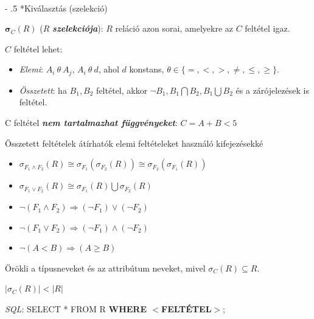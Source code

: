 \documentclass[tikz,12pt,margin=0px]{article}
\makeatletter
\renewcommand\paragraph{%
	\@startsection{paragraph}{4}{0mm}%
	{-\baselineskip}%
	{.5\baselineskip}%
	{\normalfont\normalsize\bfseries}}
\makeatother
\begin{document}
    \  \\

    \paragraph*{Kiválasztás (szelekció)}

    $\boldsymbol{\sigma}_{C}(R)$ ($R$ \emph{\textbf{szelekciója}}): $R$ reláció azon sorai, amelyekre az $C$ feltétel igaz.

    \begin{itemize}
        \item $C$ feltétel lehet:
        \begin{itemize}
            \item \emph{Elemi}: $A_i\ \theta\ A_j$, $A_i\ \theta\ d$, ahol $d$ konstans, $\theta \in \Big\{=, <, >, \neq, \leq, \geq\Big\}$.
            \item \emph{Összetett}: ha $B_1, B_2$ feltétel, akkor $\neg B_1, B_1 \bigcap B_2, B_1 \bigcup B_2$ és a zárójelezések is feltétel.
        \end{itemize}
        \item C feltétel \emph{\textbf{nem tartalmazhat függvényeket}}: $C = A + B < 5$
        {\small
        \item Összetett feltételek átírhatók elemi feltételeket használó kifejezésekké
        \begin{itemize}
            \item $\sigma_{F_1 \wedge F_2}(R) \cong \sigma_{F_1}(\sigma_{F_2}(R)) \cong \sigma_{F_2}(\sigma_{F_1}(R))$
            \item $\sigma_{F_1 \vee F_2}(R) \cong \sigma_{F_1}(R) \bigcup \sigma_{F_2}(R)$
            \item $\neg (F_{1} \wedge F_{2}) \Rightarrow (\neg F_{1}) \vee (\neg F_{2})$
            \item $\neg (F_{1} \vee F_{2}) \Rightarrow (\neg F_{1}) \wedge (\neg F_{2})$
            \item $\neg (A < B) \Rightarrow(A \geq B)$
        \end{itemize}
        }
        \item Örökli a típusneveket és az attribútum neveket, mivel $\sigma_{C}(R) \subseteq R$.
        \item $\Big|\sigma_{C}(R)\Big| < \Big|R\Big|$
        \item \emph{SQL}: SELECT * FROM R \textbf{WHERE $<$FELTÉTEL$>$};\\
    \end{itemize}
\end{document}

